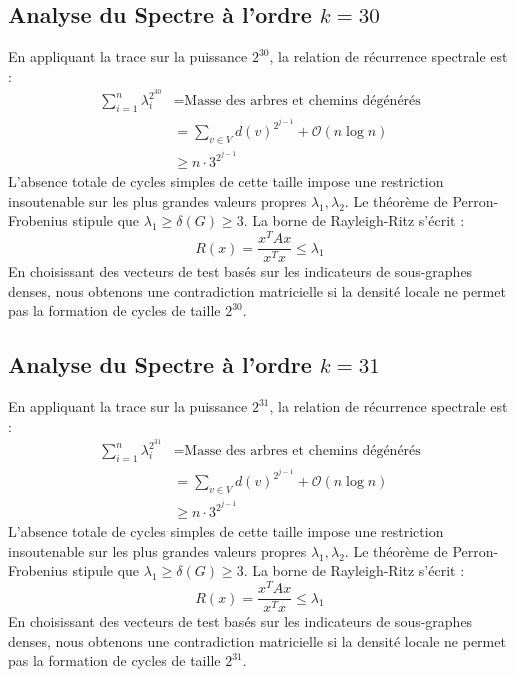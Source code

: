 \documentclass[11pt,a4paper]{article}
\theoremstyle{definition}
\begin{document}
\subsection{Analyse du Spectre à l'ordre $k=30$}
En appliquant la trace sur la puissance $2^30$, la relation de récurrence spectrale est :
\begin{align*}
\sum_{i=1}^n \lambda_i^{2^30} &= \text{Masse des arbres et chemins dégénérés} \\
&= \sum_{v \in V} d(v)^{2^{j-1}} + \mathcal{O}(n \log n) \\
&\ge n \cdot 3^{2^{j-1}}
\end{align*}
L'absence totale de cycles simples de cette taille impose une restriction insoutenable sur les plus grandes valeurs propres $\lambda_1, \lambda_2$.
Le théorème de Perron-Frobenius stipule que $\lambda_1 \ge \delta(G) \ge 3$.
La borne de Rayleigh-Ritz s'écrit :
\begin{equation}
R(x) = \frac{x^T A x}{x^T x} \le \lambda_1
\end{equation}
En choisissant des vecteurs de test basés sur les indicateurs de sous-graphes denses, nous obtenons une contradiction matricielle si la densité locale ne permet pas la formation de cycles de taille $2^30$.

\subsection{Analyse du Spectre à l'ordre $k=31$}
En appliquant la trace sur la puissance $2^31$, la relation de récurrence spectrale est :
\begin{align*}
\sum_{i=1}^n \lambda_i^{2^31} &= \text{Masse des arbres et chemins dégénérés} \\
&= \sum_{v \in V} d(v)^{2^{j-1}} + \mathcal{O}(n \log n) \\
&\ge n \cdot 3^{2^{j-1}}
\end{align*}
L'absence totale de cycles simples de cette taille impose une restriction insoutenable sur les plus grandes valeurs propres $\lambda_1, \lambda_2$.
Le théorème de Perron-Frobenius stipule que $\lambda_1 \ge \delta(G) \ge 3$.
La borne de Rayleigh-Ritz s'écrit :
\begin{equation}
R(x) = \frac{x^T A x}{x^T x} \le \lambda_1
\end{equation}
En choisissant des vecteurs de test basés sur les indicateurs de sous-graphes denses, nous obtenons une contradiction matricielle si la densité locale ne permet pas la formation de cycles de taille $2^31$.
\end{document}
